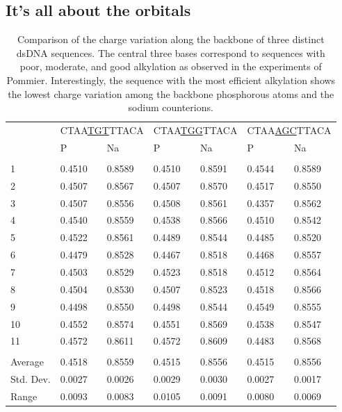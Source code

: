 \subsection{It's all about the orbitals}


\begin{table}
\begin{tabular}{lllllll}
 & \multicolumn{2}{c}{CTAA\underline{TGT}TTACA} & 
   \multicolumn{2}{c}{CTAA\underline{TGG}TTACA} &
   \multicolumn{2}{c}{CTAA\underline{AGC}TTACA} \\
 & P & Na & P & Na & P & Na \\
\hline\\[0.5ex]
1         & 0.4510 & 0.8589 & 0.4510 & 0.8591 & 0.4544 & 0.8589 \\
2         & 0.4507 & 0.8567 & 0.4507 & 0.8570 & 0.4517 & 0.8550 \\
3         & 0.4507 & 0.8556 & 0.4508 & 0.8561 & 0.4357 & 0.8562 \\
4         & 0.4540 & 0.8559 & 0.4538 & 0.8566 & 0.4510 & 0.8542 \\
5         & 0.4522 & 0.8561 & 0.4489 & 0.8544 & 0.4485 & 0.8520 \\
6         & 0.4479 & 0.8528 & 0.4467 & 0.8518 & 0.4468 & 0.8557 \\
7         & 0.4503 & 0.8529 & 0.4523 & 0.8518 & 0.4512 & 0.8564 \\
8         & 0.4504 & 0.8530 & 0.4507 & 0.8523 & 0.4518 & 0.8566 \\
9         & 0.4498 & 0.8550 & 0.4498 & 0.8544 & 0.4549 & 0.8555 \\
10        & 0.4552 & 0.8574 & 0.4551 & 0.8569 & 0.4538 & 0.8547 \\
11        & 0.4572 & 0.8611 & 0.4572 & 0.8609 & 0.4483 & 0.8568 \\
\hline\\[0.5ex]
Average   & 0.4518 & 0.8559 & 0.4515 & 0.8556 & 0.4515 & 0.8556 \\
Std. Dev. & 0.0027 & 0.0026 & 0.0029 & 0.0030 & 0.0027 & 0.0017 \\
Range     & 0.0093 & 0.0083 & 0.0105 & 0.0091 & 0.0080 & 0.0069 \\
\end{tabular}
\caption{Comparison of the charge variation along the backbone of three
         distinct dsDNA sequences.  The central three bases correspond
         to sequences with poor, moderate, and good alkylation as observed
         in the experiments of Pommier.  Interestingly, the sequence with
         the most efficient alkylation shows the lowest charge variation
         among the backbone phosphorous atoms and the sodium counterions.
         \label{Tab:Phosphate_Charges}}
\end{table}

